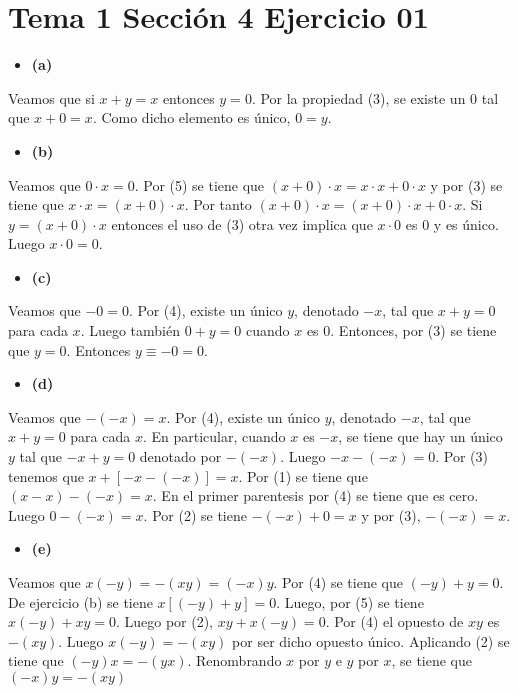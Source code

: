 \documentclass{article}
\begin{document}
\section{Tema 1 Sección 4 Ejercicio 01}
\begin{itemize}
\item \bf (a) \rm 
\end{itemize}
Veamos que si \(x+y=x\) entonces \(y=0\). Por la propiedad (3), se existe un \(0\) tal que \(x+0=x\). Como dicho elemento es único, \(0=y\).
\begin{itemize}
\item \bf (b) \rm 
\end{itemize}
Veamos que \(0\cdot x=0\). Por (5) se tiene que \(\left(x+0\right)\cdot x = x\cdot x +0\cdot x\) y por (3) se tiene que \(x\cdot x= \left(x+0\right)\cdot x\). Por tanto \(\left(x+0\right)\cdot x = \left(x+0\right)\cdot x+ 0\cdot x\). Si \(y=\left(x+0\right)\cdot x\) entonces el uso de (3) otra vez implica que \(x\cdot 0\) es \(0\) y es único. Luego \(x\cdot 0 = 0\).
\begin{itemize}
\item \bf (c) \rm 
\end{itemize}
Veamos que \(-0=0\). Por (4), existe un único \(y\), denotado \(-x\), tal que \(x+y=0\) para cada \(x\). Luego también \(0+y=0\) cuando \(x\) es \(0\). Entonces, por (3) se tiene que \(y=0\). Entonces \(y\equiv -0=0\).
\begin{itemize}
\item \bf (d) \rm 
\end{itemize}
Veamos que \(-\left(-x\right)=x\). Por (4), existe un único \(y\), denotado \(-x\), tal que \(x+y=0\) para cada \(x\). En particular, cuando \(x\) es \(-x\), se tiene que hay un único \(y\) tal que \(-x+y=0\) denotado por \(-\left(-x\right)\). Luego \(-x-\left(-x\right)=0\). Por (3) tenemos que \(x+\left[-x-\left(-x\right)\right]=x\). Por (1) se tiene que \(\left(x-x\right)-\left(-x\right)=x\). En el primer parentesis por (4) se tiene que es cero. Luego \(0-\left(-x\right)=x\). Por (2) se tiene \(-\left(-x\right)+0=x\) y por (3), \(-\left(-x\right)=x\).
\begin{itemize}
\item \bf (e) \rm 
\end{itemize}
Veamos que \(x\left(-y\right)=-\left(xy\right)=\left(-x\right)y\). Por (4) se tiene que \(\left(-y\right)+y=0\). De ejercicio (b) se tiene \(x\left[\left(-y\right)+y\right]=0\). Luego, por (5) se tiene \(x\left(-y\right)+xy=0\). Luego por (2), \(xy+x\left(-y\right)=0\). Por (4) el opuesto de \(xy\) es \(-\left(xy\right)\). Luego \(x\left(-y\right)=-\left(xy\right)\) por ser dicho opuesto único. Aplicando (2) se tiene que \(\left(-y\right)x=-\left(yx\right)\). Renombrando \(x\) por \(y\) e \(y\) por \(x\), se tiene que \(\left(-x\right)y=-\left(xy\right)\)
\end{document}
